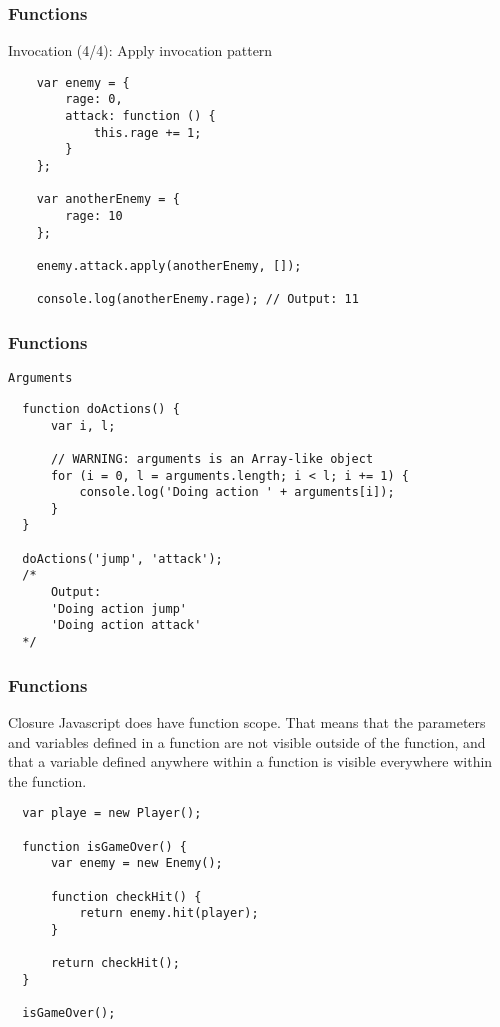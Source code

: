 \begin{frame}[fragile]
  \frametitle{Functions}

  \begin{block}{Invocation (4/4): Apply invocation pattern}
    {\scriptsize
    \begin{verbatim}
    var enemy = {
        rage: 0,
        attack: function () {
            this.rage += 1;
        }
    };

    var anotherEnemy = {
        rage: 10
    };

    enemy.attack.apply(anotherEnemy, []);

    console.log(anotherEnemy.rage); // Output: 11
    \end{verbatim}
    }
  \end{block}
\end{frame}

\begin{frame}[fragile]
  \frametitle{Functions}

  \begin{block}{\texttt{Arguments}}
  {\scriptsize
  \begin{verbatim}
  function doActions() {
      var i, l;

      // WARNING: arguments is an Array-like object
      for (i = 0, l = arguments.length; i < l; i += 1) {
          console.log('Doing action ' + arguments[i]);
      }
  }

  doActions('jump', 'attack');
  /*
      Output:
      'Doing action jump'
      'Doing action attack'
  */
  \end{verbatim}
  }
  \end{block}
\end{frame}

\begin{frame}[fragile]
  \frametitle{Functions}

  \begin{block}{Closure}
  Javascript does have function scope. That means that the parameters and variables defined in a function are not visible outside of the function, and that a variable defined anywhere within a function is visible everywhere within the function.
  {\scriptsize
  \begin{verbatim}
  var playe = new Player();

  function isGameOver() {
      var enemy = new Enemy();

      function checkHit() {
          return enemy.hit(player);
      }

      return checkHit();
  }

  isGameOver();
  \end{verbatim}
  }
  \end{block}

\end{frame}

